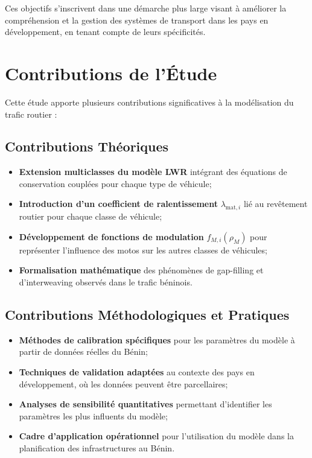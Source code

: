 Ces objectifs s'inscrivent dans une démarche plus large visant à améliorer la compréhension et la gestion des systèmes de transport dans les pays en développement, en tenant compte de leurs spécificités.

\section{Contributions de l'Étude}
\label{sec:contributions}

Cette étude apporte plusieurs contributions significatives à la modélisation du trafic routier :

\subsection{Contributions Théoriques}
\label{subsec:contrib_theoriques}

\begin{itemize}
\item \textbf{Extension multiclasses du modèle LWR} intégrant des équations de conservation couplées pour chaque type de véhicule;
\item \textbf{Introduction d'un coefficient de ralentissement} $\lambda_{\text{mat},i}$ lié au revêtement routier pour chaque classe de véhicule;
\item \textbf{Développement de fonctions de modulation} $f_{M,i}(\rho_M)$ pour représenter l'influence des motos sur les autres classes de véhicules;
\item \textbf{Formalisation mathématique} des phénomènes de gap-filling et d'interweaving observés dans le trafic béninois.
\end{itemize}

\subsection{Contributions Méthodologiques et Pratiques}
\label{subsec:contrib_pratiques}

\begin{itemize}
\item \textbf{Méthodes de calibration spécifiques} pour les paramètres du modèle à partir de données réelles du Bénin;
\item \textbf{Techniques de validation adaptées} au contexte des pays en développement, où les données peuvent être parcellaires;
\item \textbf{Analyses de sensibilité quantitatives} permettant d'identifier les paramètres les plus influents du modèle;
\item \textbf{Cadre d'application opérationnel} pour l'utilisation du modèle dans la planification des infrastructures au Bénin.
\end{itemize}

